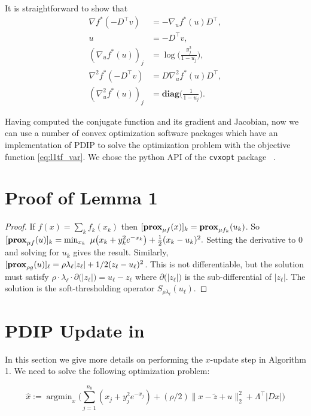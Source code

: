 \documentclass[letterpaper]{article} %
\newcommand{\citep}{\cite}
\DeclareMathOperator*{\argmin}{argmin}
\newcommand{\autoref}{\Cref}
\DeclareMathOperator*{\prox}{\bf prox}
\begin{document}
It is straightforward to show that
\begin{align}
\nabla f^*(-D^\top v) &=  -\nabla_u f^*(u) D^\top ,\\
u&=-D^\top v, \\
 (\nabla_u f^*(u))_j&=\log\bigg(\frac{y_j^2}{1-u_j}\bigg), \\
\nabla^2 f^*(-D^\top v)&=D\nabla_u^2 f^*(u)D^\top,\\  
(\nabla_u^2 f^*(u))_j&=\mathbf{diag}\bigg(\frac{1}{1-u_j}\bigg).
\end{align}


Having computed the conjugate function and its gradient and Jacobian,
now we can use a number of convex optimization software packages which
have an implementation of PDIP to solve the optimization problem with
the objective function \eqref{eq:l1tf_var}. We chose the python API of
the \texttt{cvxopt} package ~\citep{andersen_cvxopt:_2013}. 

\section{Proof of Lemma 1}

\begin{proof}
  If $f(x)=\sum_k f_k(x_k)$ then $[\prox_{\mu f}(x)]_k =
  \prox_{\mu f_k}(u_k)$. So 
  $[\prox_{\mu f}(u)]_k=\min_{x_k} \,\,
  \mu\big(x_k+y_{k}^2e^{-x_{k}}\big)+\frac{1}{2}  (x_k-u_k)^2.$
  Setting the derivative to 0 and solving for $u_k$ gives the
  result. Similarly, $[\prox_{\rho g}(u)]_\ell=\rho
  \lambda_\ell |z_\ell|+1/2(z_\ell-u_\ell)^2$. This is not differentiable,
  but the solution must satisfy $\rho \cdot \lambda_\ell \cdot \partial
  \big(|z_\ell| \big)=u_\ell-z_\ell$ where $\partial \big(|z_\ell| \big)$ is the
  sub-differential of $|z_\ell|$. The solution is the soft-thresholding
  operator $S_{\rho\lambda_\ell}(u_\ell)$.
\end{proof}




\section{PDIP Update in~\autoref{alg:conADMM}}
\label{sec:app_consADMM}

In this section we give more details on performing the $x$-update step in Algorithm 1. We need to solve the following optimization problem:

\begin{equation}
\hat{x}:=\argmin_{x} \bigg( \sum_{j=1}^{n_b} (x_j + y_j^2e^{-x_j}) + (\rho/2) \lVert x-\tilde{z} + u \lVert_2^2 + \Lambda^\top |D x| \bigg)
\label{eq:x_update_opt}
\end{equation}
\end{document}
